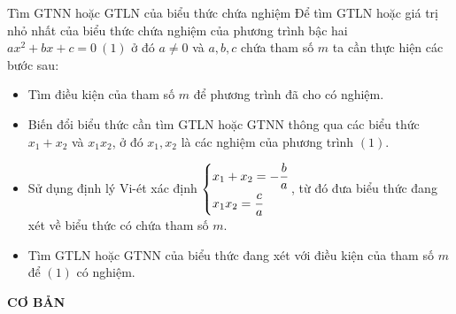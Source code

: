 \begin{dang}{Tìm GTNN hoặc GTLN của biểu thức chứa nghiệm}
	Để tìm GTLN hoặc giá trị nhỏ nhất của biểu thức chứa nghiệm của phương trình bậc hai $ax^2+bx+c=0\ (1)$ ở đó $a\neq 0$ và $a, b, c$ chứa tham số $m$  ta cần thực hiện các bước sau:
	\begin{itemize}
		\item Tìm điều kiện của tham số $m$ để phương trình đã cho có nghiệm.
		\item Biến đổi biểu thức cần tìm GTLN hoặc GTNN thông qua các biểu thức $x_1+x_2$ và $x_1x_2$, ở đó $x_1, x_2$ là các nghiệm của phương trình $(1)$.
		\item Sử dụng định lý Vi-ét xác định $\left\{\begin{aligned}&x_1+x_2=-\dfrac{b}{a}\\&x_1x_2=\dfrac{c}{a}\end{aligned}\right.$, từ đó đưa biểu thức đang xét về biểu thức có chứa tham số $m$.
		\item Tìm GTLN hoặc GTNN của biểu thức đang xét với điều kiện của tham số $m$ để $(1)$ có nghiệm.
	\end{itemize}
\end{dang}

\begin{center}
	\textbf{CƠ BẢN}
\end{center}

